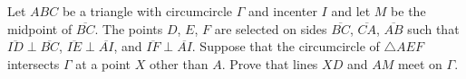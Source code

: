Let 
$ABC$
 be a triangle with circumcircle 
$\Gamma$
 and incenter 
$I$
 and let 
$M$
 be the midpoint of 
$\overline{BC}$. 
 The points 
$D$, 
$E$, 
$F$
 are selected on sides 
$\overline{BC}$, 
$\overline{CA}$, 
$\overline{AB}$
 such that 
$\overline{ID} \perp \overline{BC}$, 
$\overline{IE}\perp \overline{AI}$, and 
$\overline{IF}\perp \overline{AI}$. 
 Suppose that the circumcircle of 
$\triangle AEF$
 intersects 
$\Gamma$
 at a point 
$X$
 other than 
$A$. 
 Prove that lines 
$XD$
 and 
$AM$
 meet on 
$\Gamma$.
